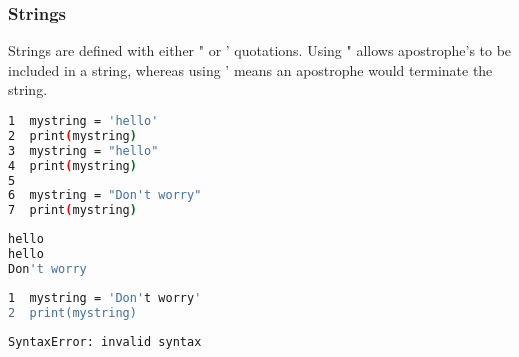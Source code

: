 \documentclass[crop=false,class=book]{standalone}
\begin{document}
\subsubsection{Strings}
Strings are defined with either " or ' quotations. Using " allows apostrophe's to be included in a string, whereas using ' means an apostrophe would terminate the string.\newline
\begin{minipage}[t]{.48\textwidth}
\centering
\begin{lstlisting}[language=bash,basicstyle=\small\ttfamily,frame=single,caption=input]
1  mystring = 'hello'
2  print(mystring)
3  mystring = "hello"
4  print(mystring)
5
6  mystring = "Don't worry"
7  print(mystring)
\end{lstlisting}
\end{minipage}\hfill
\begin{minipage}[t]{.48\textwidth}
\centering
\begin{lstlisting}[language=bash,basicstyle=\small\ttfamily,frame=single,caption=output]
hello
hello
Don't worry
\end{lstlisting}
\end{minipage}\newline
\begin{minipage}[t]{.48\textwidth}
\centering
\begin{lstlisting}[language=bash,basicstyle=\small\ttfamily,frame=single,caption=input]
1  mystring = 'Don't worry'
2  print(mystring)
\end{lstlisting}
\end{minipage}\hfill
\begin{minipage}[t]{.48\textwidth}
\centering
\begin{lstlisting}[language=bash,basicstyle=\small\ttfamily,frame=single,caption=output]
SyntaxError: invalid syntax
\end{lstlisting}
\end{minipage}
\end{document}
